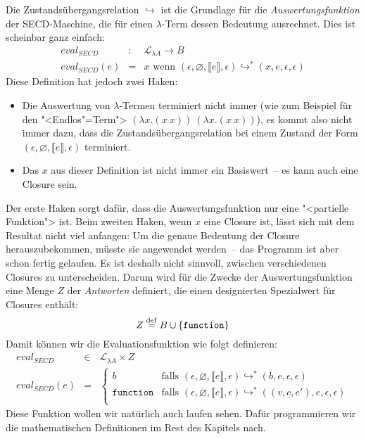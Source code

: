 %
Die Zustandsübergangsrelation $\hookrightarrow$ ist die Grundlage
für die \textit{Auswertungsfunktion} der
SECD-Maschine, die für einen $\lambda$-Term dessen Bedeutung
ausrechnet.  Dies ist scheinbar ganz einfach:
%
\begin{eqnarray*}
  \mathit{eval}_\mathit{SECD} & : & \mathcal{L}_{\lambda{}A} \rightarrow B\\
  \mathit{eval}_\mathit{SECD}(e) &= & x \textrm{ wenn } (\epsilon, \varnothing, \llbracket e\rrbracket, \epsilon)
    \hookrightarrow^* (x, e, \epsilon, \epsilon)
\end{eqnarray*}
%
Diese Definition hat jedoch zwei Haken:
%
\begin{itemize}
\item Die Auswertung von $\lambda$-Termen terminiert nicht immer (wie
  zum Beispiel für den "<Endlos"=Term"> $(\lambda x.(x~x))~(\lambda x.(x~x))$), es kommt
  also nicht immer dazu, dass die Zustandsübergangsrelation bei einem
  Zustand der Form $(\epsilon, \varnothing, \llbracket e\rrbracket,
  \epsilon)$ terminiert.
\item Das $x$ aus dieser Definition ist nicht immer ein Basiswert~--
  es kann auch eine Closure sein.
\end{itemize}
%
Der erste Haken sorgt dafür, dass die Auswertungsfunktion nur eine
"<partielle Funktion"> ist.  Beim zweiten
Haken, wenn $x$ eine Closure ist, lässt sich mit dem Resultat nicht
viel anfangen: Um die genaue Bedeutung der Closure herauszubekommen,
müsste sie angewendet werden~-- das Programm ist aber schon fertig
gelaufen.  Es ist deshalb nicht sinnvoll, zwischen verschiedenen
Closures zu unterscheiden.  Darum wird für die Zwecke der
Auswertungsfunktion eine Menge $Z$ der \textit{Antworten}
definiert, die einen designierten Spezialwert für Closures enthält:
%
\begin{displaymath}
  Z \stackrel{\rm def}{=}{} B \cup \{ \texttt{function} \}
\end{displaymath}
%
Damit können wir die Evaluationsfunktion wie folgt definieren:
%
\begin{eqnarray*}
  \mathit{eval}_\mathit{SECD} & \in & \mathcal{L}_{\lambda{}A} \times Z\\
  \mathit{eval}_\mathit{SECD}(e) & = &
  \begin{cases}
    b & \textrm{falls } (\epsilon, \varnothing, \llbracket e\rrbracket, \epsilon)
    \hookrightarrow^* (b, e, \epsilon, \epsilon)\\
    \texttt{function} & \textrm{falls } (\epsilon, \varnothing, \llbracket e\rrbracket, \epsilon)
    \hookrightarrow^* ((v, \underline{c}, e'), e, \epsilon, \epsilon)\\
  \end{cases}
\end{eqnarray*}
%
Diese Funktion wollen wir natürlich auch laufen sehen.  Dafür
programmieren wir die mathematischen Definitionen im Rest des Kapitels
nach.


